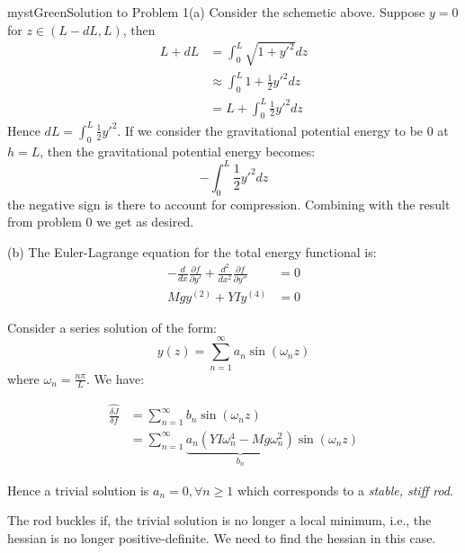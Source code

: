 \begin{mystadmonition}{mystGreen}{Solution to Problem 1}(a) Consider the schemetic above. Suppose $y=0$ for $z\in (L -dL,L)$, then
\begin{equation}
\begin{aligned}
L+dL&=\int_0^L \sqrt{1+y'^2}dz \\ 
&\approx \int_0^L 1 + \frac{1}{2}y'^2dz\\
&= L + \int_0^L \frac{1}{2}y'^2dz
\end{aligned}
\end{equation}
Hence $dL=\int_0^L \frac{1}{2}y'^2$. If we consider the gravitational potential energy to be 0 at $h=L$, then the gravitational potential energy becomes:
\begin{equation}
-\int_0^L \frac{1}{2}y'^2dz
\end{equation}
the negative sign is there to account for compression. Combining with the result from problem 0 we get as desired.

(b) The Euler-Lagrange equation for the total energy functional is:
\begin{equation}
\begin{aligned}
-\frac{d}{dx}\frac{\partial f}{\partial y'}+\frac{d^2}{dx^2}\frac{\partial f}{\partial y''} &= 0 \\
Mgy^{(2)}+YIy^{(4)} &= 0
\end{aligned}
\end{equation}

Consider a series solution of the form:
\begin{equation}
y(z)=\sum_{n=1}^{\infty} a_n\sin(\omega_n z)
\end{equation}
where $\omega_n = \frac{n\pi}{L}$. We have:

\begin{equation}
\begin{aligned}
\widehat{\frac{\delta J}{\delta f}} &= \sum_{n=1}^{\infty}  b_n \sin(\omega_n z) \\
&= \sum_{n=1}^{\infty}\underbrace{a_n(YI\omega_n^4-Mg\omega_n^2)}_{b_n}\sin(\omega_n z)
\end{aligned}
\end{equation}

Hence a trivial solution is $a_n=0, \forall n\geq 1$ which corresponds to a \textit{stable, stiff rod}.

The rod buckles if, the trivial solution is no longer a local minimum, i.e., the hessian is no longer positive-definite. We need to find the hessian in this case.


\end{mystadmonition}
